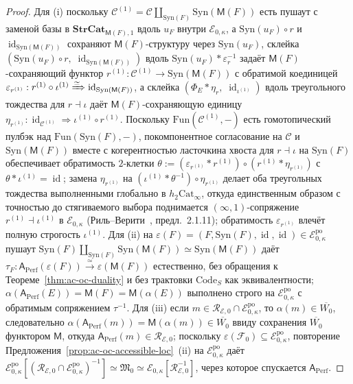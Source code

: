 \documentclass[11pt]{article}
\theoremstyle{plain}
\theoremstyle{definition}
\newcommand{\cF}{\mathcal{F}}
\newcommand{\cC}{\mathcal{C}}
\newcommand{\fM}{\mathfrak{M}}
\newcommand{\Fun}{\mathrm{Fun}}
\newcommand{\Cat}{\mathrm{Cat}}
\newcommand{\Syn}{\mathrm{Syn}}
\newcommand{\cE}{\mathcal{E}}
\DeclareMathOperator{\id}{id}
\begin{document}
\begin{proof}
Для (i) поскольку $\cC^{(1)} = \cC \amalg_{\Syn(F)} \Syn(\mathsf{M}(F))$ есть пушаут с заменой базы в $\mathbf{StrCat}_{\mathsf{M}(F), 1}$ вдоль $u_F$ внутри $\cE_{0,\kappa}$, а $\Syn(u_F) \circ r$ и $\id_{\Syn(\mathsf{M}(F))}$ сохраняют $\mathsf{M}(F)$-структуру через $\Syn(u_F)$, склейка $(\Syn(u_F) \circ r,\; \id_{\Syn(\mathsf{M}(F))})$ вдоль $\Syn(u_F) \ast \varepsilon_r^{-1}$ задаёт $\mathsf{M}(F)$-сохраняющий функтор $r^{(1)} : \cC^{(1)} \to \Syn(\mathsf{M}(F))$ с обратимой коединицей $\varepsilon_{r^{(1)}} : r^{(1)} \circ \iota^{(1)} \xRightarrow{\simeq} \id_{\Syn(\mathsf{M}(F))}$, а склейка $(\Phi_E \ast \eta_r,\; \id_{\iota^{(1)}})$ вдоль треугольного тождества для $r \dashv \iota$ даёт $\mathsf{M}(F)$-сохраняющую единицу $\eta_{r^{(1)}} : \id_{\cC^{(1)}} \Rightarrow \iota^{(1)} \circ r^{(1)}$. Поскольку $\Fun(\cC^{(1)}, -)$ есть гомотопический пулбэк над $\Fun(\Syn(F), -)$, покомпонентное согласование на $\cC$ и $\Syn(\mathsf{M}(F))$ вместе с когерентностью ласточкина хвоста для $r \dashv \iota$ на $\Syn(F)$ обеспечивает обратимость $2$-клетки $\theta := (\varepsilon_{r^{(1)}} \ast r^{(1)}) \circ (r^{(1)} \ast \eta_{r^{(1)}})$ с $\theta \ast \iota^{(1)} = \id$; замена $\eta_{r^{(1)}}$ на $(\iota^{(1)} \ast \theta^{-1}) \circ \eta_{r^{(1)}}$ делает оба треугольных тождества выполненными глобально в $h_2\Cat_\infty$, откуда единственным образом с точностью до стягиваемого выбора поднимается $(\infty, 1)$-сопряжение $r^{(1)} \dashv \iota^{(1)}$ в $\cE_{0,\kappa}$ (Риль--Верити~\cite{RiehlVerity2022}, предл.~2.1.11); обратимость $\varepsilon_{r^{(1)}}$ влечёт полную строгость $\iota^{(1)}$. Для (ii) на $\varepsilon(F) = (F, \Syn(F), \id, \id) \in \cE_{0,\kappa}^{\mathrm{po}}$ пушаут $\Syn(F) \amalg_{\Syn(F)} \Syn(\mathsf{M}(F)) \simeq \Syn(\mathsf{M}(F))$ даёт $\tau_F : \mathsf{A}_{\mathrm{Perf}}(\varepsilon(F)) \xrightarrow{\simeq} \varepsilon(\mathsf{M}(F))$ естественно, без обращения к Теореме~\ref{thm:ac-oc-duality} и без трактовки $\mathrm{Code}_S$ как эквивалентности; $\alpha(\mathsf{A}_{\mathrm{Perf}}(E)) = \mathsf{M}(F) = \mathsf{M}(\alpha(E))$ выполнено строго на $\cE_{0,\kappa}^{\mathrm{po}}$ с обратимым сопряжением $\tau^{-1}$. Для (iii) если $m \in \mathcal{R}_{\cE, 0} \cap \cE_{0,\kappa}^{\mathrm{po}}$, то $\alpha(m) \in \overline{W_0}$, следовательно $\alpha(\mathsf{A}_{\mathrm{Perf}}(m)) = \mathsf{M}(\alpha(m)) \in \overline{W_0}$ ввиду сохранения $\overline{W_0}$ функтором $\mathsf{M}$, откуда $\mathsf{A}_{\mathrm{Perf}}(m) \in \mathcal{R}_{\cE, 0}$; поскольку $\varepsilon(\cF_0) \subseteq \cE_{0,\kappa}^{\mathrm{po}}$, повторение Предложения~\ref{prop:ac-oc-accessible-loc}~(ii) на $\cE_{0,\kappa}^{\mathrm{po}}$ даёт $\cE_{0,\kappa}^{\mathrm{po}}[(\mathcal{R}_{\cE,0} \cap \cE_{0,\kappa}^{\mathrm{po}})^{-1}] \simeq \fM_0 \simeq \cE_{0,\kappa}[\mathcal{R}_{\cE,0}^{-1}]$, через которое спускается $\mathsf{A}_{\mathrm{Perf}}$.
\end{proof}
\end{document}
